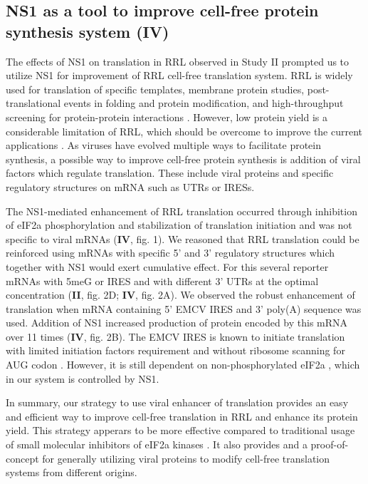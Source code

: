 	
	\subsection{NS1 as a tool to improve cell-free protein synthesis system (IV)}
	
		The effects of NS1 on translation in \gls{RRL} observed in Study II prompted us to utilize NS1 for improvement of \gls{RRL} cell-free translation system. \gls{RRL} is widely used for translation of specific templates, membrane protein studies, post-translational events in folding and protein modification, and high-throughput screening for protein-protein interactions \parencite{Fuller2000, Douthwaite2012, Fixsen2010, Wang2011}. However, low protein yield is a considerable limitation of RRL, which should be overcome to improve the current applications \parencite{Carlson2012}. As viruses have evolved multiple ways to facilitate protein synthesis, a possible way to improve cell-free protein synthesis is addition of viral factors which regulate translation. These include viral proteins and specific regulatory structures on mRNA such as \gls{UTR}s or \glspl{IRES}. 
	
		The NS1-mediated enhancement of \gls{RRL} translation occurred through inhibition of \gls{eIF2a} phosphorylation and stabilization of translation initiation and was not specific to viral mRNAs (\textbf{IV}, fig. 1). We reasoned that \gls{RRL} translation could be reinforced using mRNAs with specific 5' and 3' regulatory structures which together with NS1 would exert cumulative effect. For this several reporter mRNAs with \gls{5meG} or \gls{IRES} and with different 3' \gls{UTR}s at the optimal concentration (\textbf{II}, fig. 2D; \textbf{IV}, fig. 2A). We observed the robust enhancement of translation when mRNA containing 5' \gls{EMCV} \gls{IRES} and 3' poly(A) sequence was used. Addition of NS1 increased production of protein encoded by this mRNA over 11 times (\textbf{IV}, fig. 2B). The \gls{EMCV} \gls{IRES} is known to initiate translation with limited initiation factors requirement and without ribosome scanning for AUG codon \parencite{Pestova2001}. However, it is still dependent on non-phosphorylated \gls{eIF2a} \parencite{Terenin2008}, which in our system is controlled by NS1. 
	
		In summary, our strategy to use viral enhancer of translation provides an easy and efficient way to improve cell-free translation in \gls{RRL} and enhance its protein yield. This strategy apperars to be more effective compared to traditional usage of small molecular inhibitors of \gls{eIF2a} kinases \parencite{Jammi2003}. It also provides and a proof-of-concept for generally utilizing viral proteins to modify cell-free translation systems from different origins.
	
